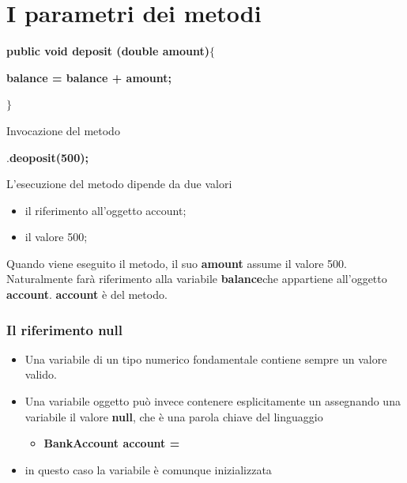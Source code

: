 \section*{I parametri dei metodi}
\begin{frame}
\begin{block}{}\footnotesize
\textbf{public void deposit (double \alert{amount})}$\{$\\
\begin{center}
\textbf{balance = balance + \alert{amount};}
\end{center}
$\}$
\end{block}
\begin{block}{Invocazione del metodo}\footnotesize
\begin{center}
.\textbf{deoposit(500);}
\end{center}
L'esecuzione del metodo dipende da due valori
\begin{itemize}
\item il \alert{riferimento} all'oggetto account;
\item il \alert{valore} 500;
\end{itemize}
\end{block}
\begin{block}{}\footnotesize
Quando viene eseguito il metodo, il suo  \textbf{amount} assume il valore 500.
Naturalmente farà riferimento alla variabile \textbf{balance}che appartiene all'oggetto \textbf{account}. \textbf{account} è  del metodo.
\end{block}
\end{frame}

\begin{frame}
\frametitle{Il riferimento null}
\begin{itemize}
\item Una variabile di un tipo numerico fondamentale contiene sempre un valore valido.
\item Una variabile oggetto può invece contenere esplicitamente un \textbf{}
assegnando una variabile il valore \textbf{\alert{null}}, che è una parola chiave del linguaggio
\begin{itemize}
\item \textbf{BankAccount account = }
\end{itemize}
\item in questo caso la variabile è comunque inizializzata
\end{itemize}
\end{frame}

